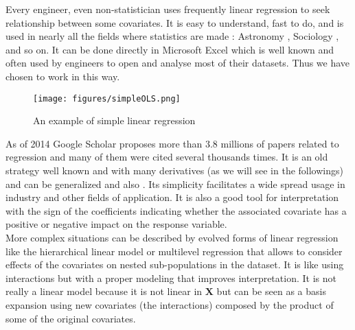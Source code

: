 \documentclass[12pt,a4paper]{report}
\begin{document}
		Every engineer, even non-statistician uses frequently linear regression to seek relationship between some covariates. It is easy to understand, fast to do, and is used in nearly all the fields where statistics are made \cite{montgomery2012introduction}: Astronomy \cite{isobe1990linear}, Sociology \cite{longford2012revision}, and so on. It can be done directly in Microsoft Excel which is well known and often used by engineers to open and analyse most of their datasets. Thus we have chosen to work in this way.\\
		 
\begin{figure}
\centering
	\texttt{[image: figures/simpleOLS.png]} 
	\caption{An example of simple linear regression}
\end{figure}		 
		 
		 As of 2014 Google Scholar proposes more than $3.8$ millions of papers related to regression and many of them were cited several thousands times. It is an old strategy well known and with many derivatives (as we will see in the followings) and can be generalized 		 \cite{kiebel2003general,wickens2004general,nelder1972generalized} and also \cite{mccullagh1989generalized}. 
	Its simplicity facilitates a wide spread usage in industry and other fields of application. It is also a good tool for interpretation with the sign of the coefficients indicating whether the associated covariate has a positive or negative impact on the response variable. \\
	
	More complex situations can be described by evolved forms of linear regression like the hierarchical linear model \cite{raudenbush2002hierarchical,woltman2012introduction}  or  multilevel regression \cite{moerbeek2003comparison,maas2004robustness,hox1998multilevel} that allows to consider effects of the covariates on nested sub-populations in the dataset. It is like using interactions but with a proper modeling that improves interpretation. It is not really a linear model because it is not linear in $\boldsymbol{X}$ but can be seen as a basis expansion using new covariates (the interactions) composed by the product of some of the original covariates.
%			
%
\end{document}
